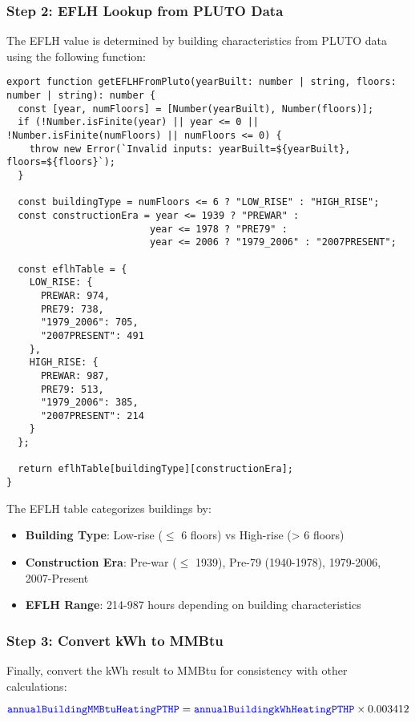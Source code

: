 \documentclass{article}
\newcommand{\code}[1]{\textcolor{blue}{\texttt{#1}}}
\begin{document}
\subsubsection{Step 2: EFLH Lookup from PLUTO Data}

The EFLH value is determined by building characteristics from PLUTO data using the following function:

\begin{lstlisting}
export function getEFLHFromPluto(yearBuilt: number | string, floors: number | string): number {
  const [year, numFloors] = [Number(yearBuilt), Number(floors)];
  if (!Number.isFinite(year) || year <= 0 || !Number.isFinite(numFloors) || numFloors <= 0) {
    throw new Error(`Invalid inputs: yearBuilt=${yearBuilt}, floors=${floors}`);
  }

  const buildingType = numFloors <= 6 ? "LOW_RISE" : "HIGH_RISE";
  const constructionEra = year <= 1939 ? "PREWAR" :
                         year <= 1978 ? "PRE79" :
                         year <= 2006 ? "1979_2006" : "2007PRESENT";

  const eflhTable = {
    LOW_RISE: {
      PREWAR: 974,
      PRE79: 738,
      "1979_2006": 705,
      "2007PRESENT": 491
    },
    HIGH_RISE: {
      PREWAR: 987,
      PRE79: 513,
      "1979_2006": 385,
      "2007PRESENT": 214
    }
  };
  
  return eflhTable[buildingType][constructionEra];
}
\end{lstlisting}

The EFLH table categorizes buildings by:
\begin{itemize}
    \item \textbf{Building Type}: Low-rise ($\leq$ 6 floors) vs High-rise (> 6 floors)
    \item \textbf{Construction Era}: Pre-war ($\leq$ 1939), Pre-79 (1940-1978), 1979-2006, 2007-Present
    \item \textbf{EFLH Range}: 214-987 hours depending on building characteristics
\end{itemize}

\subsubsection{Step 3: Convert kWh to MMBtu}

Finally, convert the kWh result to MMBtu for consistency with other calculations:

\begin{equation}
\code{annualBuildingMMBtuHeatingPTHP} = \code{annualBuildingkWhHeatingPTHP} \times 0.003412
\end{equation}
\end{document}
